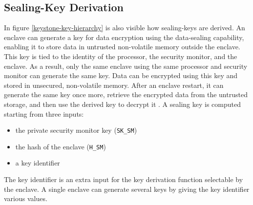 \subsection{Sealing-Key Derivation}
In figure \ref{keystone-key-hierarchy} is also visible how sealing-keys are derived. An enclave can generate a key for data encryption using the data-sealing capability, enabling it to store data in untrusted non-volatile memory outside the enclave. This key is tied to the identity of the processor, the security monitor, and the enclave. As a result, only the same enclave using the same processor and security monitor can generate the same key. Data can be encrypted using this key and stored in unsecured, non-volatile memory. After an enclave restart, it can generate the same key once more, retrieve the encrypted data from the untrusted storage, and then use the derived key to decrypt it \cite{keystone-doc}.
A sealing key is computed starting from three inputs:
\begin{itemize}
    \item the private security monitor key (\texttt{SK\_SM})
    \item the hash of the enclave (\texttt{H\_SM})
    \item a key identifier
\end{itemize}
The key identifier is an extra input for the key derivation function selectable by the enclave. A single enclave can generate several keys by giving the key identifier various values.


